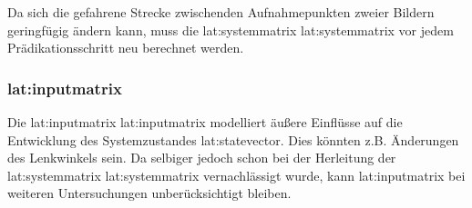 Da sich die gefahrene Strecke zwischenden Aufnahmepunkten zweier Bildern geringfügig ändern kann, muss die \glsdesc{lat:systemmatrix} \gls{lat:systemmatrix} vor jedem Prädikationsschritt neu berechnet werden.

\subsubsection{\glsdesc{lat:inputmatrix}}
Die \glsdesc{lat:inputmatrix} \gls{lat:inputmatrix} modelliert äußere Einflüsse auf die Entwicklung des Systemzustandes \gls{lat:statevector}. Dies könnten z.B. Änderungen des Lenkwinkels sein. Da selbiger jedoch schon bei der Herleitung der \glsdesc{lat:systemmatrix} \gls{lat:systemmatrix} vernachlässigt wurde, kann \gls{lat:inputmatrix} bei weiteren Untersuchungen unberücksichtigt bleiben.

